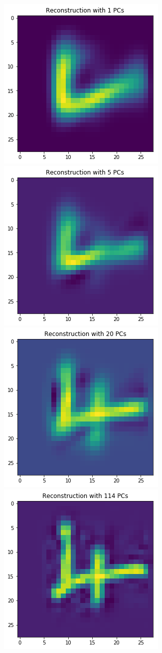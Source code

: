 \includegraphics[width=0.25\linewidth]{rec91.png}
\includegraphics[width=0.25\linewidth]{rec95.png}
\includegraphics[width=0.25\linewidth]{rec920.png}
\includegraphics[width=0.25\linewidth]{rec9114.png}\\